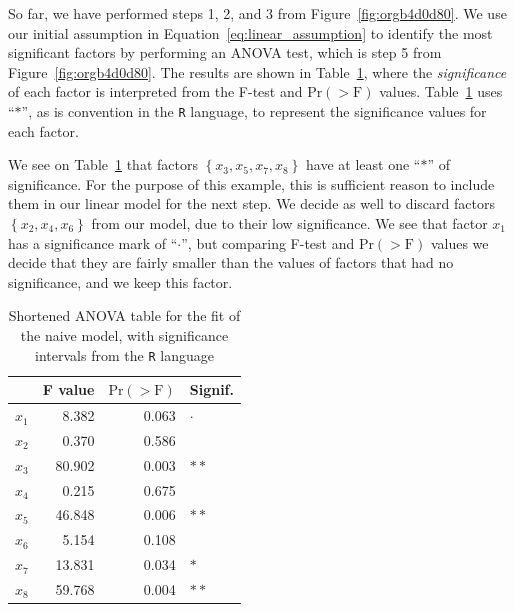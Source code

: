 \documentclass[conference]{IEEEtran}
\begin{document}
So    far,    we     have    performed    steps    1,    2,     and    3    from
Figure~\ref{fig:orgb4d0d80}.    We    use    our   initial    assumption    in
Equation~\eqref{eq:linear_assumption} to identify the most significant factors by
performing     an      ANOVA     test,     which     is      step     5     from
Figure~\ref{fig:orgb4d0d80}.      The      results      are      shown      in
Table~\ref{tab:anova_linear},   where  the   \emph{significance}  of   each  factor   is
interpreted    from    the    F-test    and    \(\text{Pr}(>\text{F})\)    values.
Table~\ref{tab:anova_linear}  uses ``\(*\)'',  as is  convention in  the \texttt{R}
language, to represent the significance values for each factor.

We see on  Table~\ref{tab:anova_linear} that factors \(\left\{x_3,x_5,x_7,x_8\right\}\)
have at least one ``\(*\)'' of significance. For the purpose of this example, this
is sufficient reason to  include them in our linear model for  the next step. We
decide as well to discard  factors \(\left\{x_2,x_4,x_6\right\}\) from our model, due
to their low  significance. We see that  factor \(x_1\) has a  significance mark of
``\(\cdot\)'', but  comparing F-test  and \(\text{Pr}(>\text{F})\)  values we  decide that
they are fairly smaller than the values of factors that had no significance, and
we keep this factor.

\begin{table}[t]
\centering
\caption{Shortened ANOVA table for the fit of the naive model, with significance intervals from the \texttt{R} language}
\label{tab:anova_linear}
\begingroup\small
\begin{tabular}{lrrl}
  \toprule
 & F value & $\text{Pr}(>\text{F})$ & Signif. \\
  \midrule
$x_1$ & 8.382 & 0.063 & $\cdot$ \\
  $x_2$ & 0.370 & 0.586 &   \\
  $x_3$ & 80.902 & 0.003 & $**$ \\
  $x_4$ & 0.215 & 0.675 &   \\
  $x_5$ & 46.848 & 0.006 & $**$ \\
  $x_6$ & 5.154 & 0.108 &   \\
  $x_7$ & 13.831 & 0.034 & $*$ \\
  $x_8$ & 59.768 & 0.004 & $**$ \\
   \bottomrule
\end{tabular}
\endgroup
\end{table}
\end{document}
